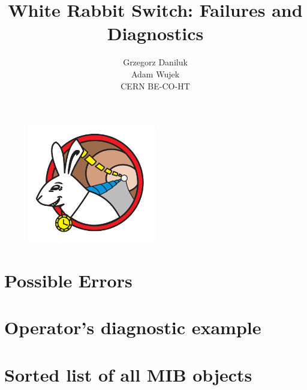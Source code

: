 \documentclass[a4paper, 12pt]{article}
\begin{document}
\setcounter{tocdepth}{2}

\title{White Rabbit Switch: Failures and Diagnostics}
\author{Grzegorz Daniluk\\ Adam Wujek\\[.5cm] CERN BE-CO-HT\\ \small{\gitrevinfo}}
\maketitle
\thispagestyle{empty}

\begin{figure}[ht!]
  \centering
  \vspace{1.3cm}
  \includegraphics[width=0.50\textwidth]{../images/WRlogo.pdf}
\end{figure}

\newpage

\newpage

\newpage

\tableofcontents

\newpage


\newpage

\newpage
\section{Possible Errors}
\label{sec:failures}


\appendix
\newpage
\section{Operator's diagnostic example}


\newpage
\section{Sorted list of all MIB objects}
\label{sec:snmp_exports:sorted}
\printnoidxglossary[type=snmp_all,style=tree,sort=letter]


\forallglsentries{\thislabel}%
{%
  \ifglsused{\thislabel}{}{\glsadd[format=ignore]{\thislabel}}%
}
\end{document}
